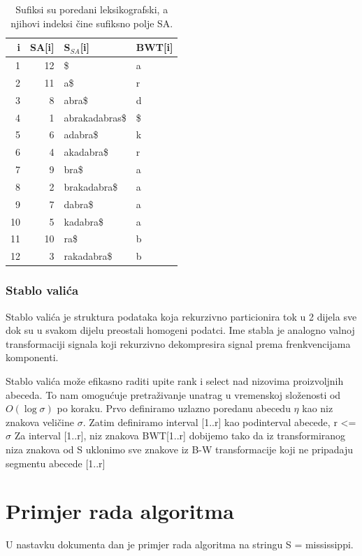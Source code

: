 \documentclass[a4paper,12pt]{article}
\begin{document}
\begin{table}[h!]
	\caption{Sufiksi su poredani leksikografski, a njihovi indeksi čine sufiksno polje SA.}
	\label{tablePrimjer2}
	\begin{center}
		\begin{tabular}{rrll}
			\toprule
			i & SA[i] & S$_{SA}$[i] & BWT[i] \\
			\midrule
			1 & 12 & \$ & a\\
			2 & 11 &  a\$ & r \\
			3 & 8 & abra\$ & d \\
			4 & 1 & abrakadabras\$ & \$ \\
			5 & 6 & adabra\$ & k \\
			6 & 4 & akadabra\$ & r \\
			7 & 9 & bra\$ & a\\
			8 & 2 & brakadabra\$ & a\\
			9 & 7 & dabra\$ & a \\
			10 & 5 & kadabra\$ & a\\
			11 & 10 & ra\$ & b \\
			12 & 3 & rakadabra\$ & b\\
			\bottomrule
		\end{tabular}
	\end{center}
\end{table}

\newpage

\subsubsection{Stablo valića}
\label{WT_defincija}

Stablo valića je struktura podataka koja rekurzivno particionira tok u 2 dijela sve dok su u svakom dijelu preostali homogeni podatci. Ime stabla je analogno valnoj transformaciji signala koji rekurzivno dekompresira signal prema frenkvencijama komponenti. 

Stablo valića može efikasno raditi upite rank i select nad nizovima proizvoljnih abeceda. To nam omogućuje pretraživanje unatrag u vremenskoj složenosti od  $O(\log\sigma)$ po koraku.
Prvo definiramo uzlazno poredanu abecedu $\eta$ kao niz znakova veličine $\sigma $.  
Zatim definiramo interval [1..r] kao podinterval abecede, r <= $\sigma$
Za interval [1..r], niz znakova BWT[1..r] dobijemo tako da iz transformiranog niza znakova od S uklonimo sve znakove iz B-W transformacije koji ne pripadaju segmentu abecede [1..r]

\section{Primjer rada algoritma}
U nastavku dokumenta dan je primjer rada algoritma na stringu S = mississippi.
\end{document}
